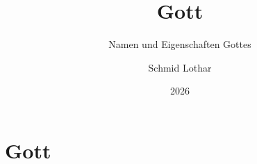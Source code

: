 \documentclass[fontsize=14pt]{mybibreport}
\title{Gott}
\subtitle{Namen und Eigenschaften Gottes}
\author{Schmid Lothar}
\date{2026}
\begin{document}
    \mytitlepage

    \tableofcontents

    \chapter{Gott}

    
\end{document}
